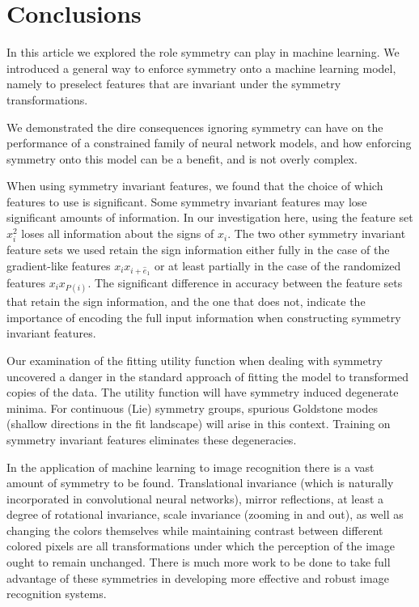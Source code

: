 \documentclass[onecolumn, nofootinbib, aps, pra, 11pt]{revtex4-1}
\begin{document}
\section{Conclusions}\label{Sec:conclusions}

In this article we explored the role symmetry can play in machine learning. We introduced a general way to enforce symmetry onto a machine learning model, namely to preselect features that are invariant under the symmetry transformations.

We demonstrated the dire consequences ignoring symmetry can have on the performance of a constrained family of neural network models, and how enforcing symmetry onto this model can be a benefit, and is not overly complex.

When using symmetry invariant features, we found that the choice of which features to use is significant. Some symmetry invariant features may lose significant amounts of information. In our investigation here, using the feature set $x_i^2$ loses all information about the signs of $x_i$. The two other symmetry invariant feature sets we used retain the sign information either fully in the case of the gradient-like features $x_i x_{i + {\hat e}_1}$ or at least partially in the case of the randomized features $x_i x_{P(i)}$. The significant difference in accuracy between the feature sets that retain the sign information, and the one that does not, indicate the importance of encoding the full input information when constructing symmetry invariant features.

Our examination of the fitting utility function when dealing with symmetry uncovered a danger in the standard approach of fitting the model to transformed copies of the data. The utility function will have symmetry induced degenerate minima. For continuous (Lie) symmetry groups, spurious Goldstone modes (shallow directions in the fit landscape) will arise in this context. Training on symmetry invariant features eliminates these degeneracies. 

In the application of machine learning to image recognition there is a vast amount of symmetry to be found. Translational invariance (which is naturally incorporated in convolutional neural networks), mirror reflections, at least a degree of rotational invariance, scale invariance (zooming in and out), as well as changing the colors themselves while maintaining contrast between different colored pixels are all transformations under which the perception of the image ought to remain unchanged. There is much more work to be done to take full advantage of these symmetries in developing more effective and robust image recognition systems.
\end{document}
